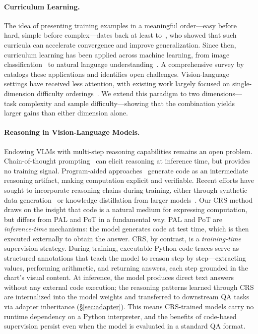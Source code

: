 ﻿\documentclass[journal]{IEEEtran}
\newcommand{\crs}{CRS}
\begin{document}
\paragraph{Curriculum Learning.}
The idea of presenting training examples in a meaningful order---easy before hard, simple before complex---dates back at least to~\cite{bengio2009curriculum}, who showed that such curricula can accelerate convergence and improve generalization. Since then, curriculum learning has been applied across machine learning, from image classification~\cite{hacohen2019power} to natural language understanding~\cite{xu2020curriculum}. A comprehensive survey by~\cite{soviany2022curriculum} catalogs these applications and identifies open challenges. Vision-language settings have received less attention, with existing work largely focused on single-dimension difficulty orderings~\cite{shen2021much}. We extend this paradigm to two dimensions---task complexity and sample difficulty---showing that the combination yields larger gains than either dimension alone.

\paragraph{Reasoning in Vision-Language Models.}
Endowing VLMs with multi-step reasoning capabilities remains an open problem. Chain-of-thought prompting~\cite{wei2022chain} can elicit reasoning at inference time, but provides no training signal. Program-aided approaches~\cite{gao2023pal,chen2022program} generate code as an intermediate reasoning artifact, making computation explicit and verifiable. Recent efforts have sought to incorporate reasoning chains during training, either through synthetic data generation~\cite{lu2024mathvista} or knowledge distillation from larger models~\cite{shao2024visual}. Our \crs{} method draws on the insight that code is a natural medium for expressing computation, but differs from PAL and PoT in a fundamental way. PAL and PoT are \emph{inference-time} mechanisms: the model generates code at test time, which is then executed externally to obtain the answer. \crs{}, by contrast, is a \emph{training-time} supervision strategy. During training, executable Python code traces serve as structured annotations that teach the model to reason step by step---extracting values, performing arithmetic, and returning answers, each step grounded in the chart's visual content. At inference, the model produces direct text answers without any external code execution; the reasoning patterns learned through \crs{} are internalized into the model weights and transferred to downstream QA tasks via adapter inheritance (\S\ref{sec:adapter}). This means \crs{}-trained models carry no runtime dependency on a Python interpreter, and the benefits of code-based supervision persist even when the model is evaluated in a standard QA format.
\end{document}
